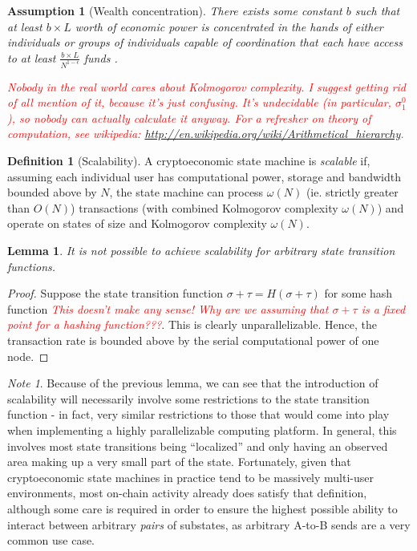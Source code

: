 \documentclass[11pt,a4paper]{report}
\newcommand{\comment}[1]{\textcolor{red}{\textit{#1}}}
\theoremstyle{plain}
\newtheorem{lem}[thm]{Lemma}
\newtheorem{assm}{Assumption}[chapter]
\theoremstyle{definition}
\newtheorem{defn}{Definition}[chapter]
\theoremstyle{remark}
\newtheorem*{note}{Note}
\begin{document}
\begin{assm}[Wealth concentration]
There exists some constant $b$ such that at least $b \times  L$ worth of economic power is concentrated in the hands of either individuals or groups of individuals capable of coordination that each have access to at least $\frac{b \times  L}{N^{1-\epsilon}}$ funds \citep{piketty_capital_2014}.
\end{assm}

\comment{Nobody in the real world cares about Kolmogorov complexity.  I suggest getting rid of all mention of it, because it's just confusing.  It's undecidable (in particular, $\sigma^0_1$), so nobody can actually calculate it anyway.  For a refresher on theory of computation, see wikipedia: \url{http://en.wikipedia.org/wiki/Arithmetical_hierarchy}.}

\begin{defn}[Scalability]
A cryptoeconomic state machine is \emph{scalable} if, assuming each individual user has computational power, storage and bandwidth bounded above by $N$, the state machine can process $\omega(N)$ (ie. strictly greater than $O(N)$) transactions (with combined Kolmogorov complexity $\omega(N)$) and operate on states of size and Kolmogorov complexity $\omega(N)$.
\end{defn}

\begin{lem}
It is not possible to achieve scalability for arbitrary state transition functions.
\end{lem}
\begin{proof}
Suppose the state transition function $\sigma + \tau = H(\sigma + \tau)$ for some hash function \comment{This doesn't make any sense!  Why are we assuming that $\sigma + \tau$ is a fixed point for a hashing function???}. This is clearly unparallelizable. Hence, the transaction rate is bounded above by the serial computational power of one node.
\end{proof}

\begin{note}
Because of the previous lemma, we can see that the introduction of scalability will necessarily involve some restrictions to the state transition function - in fact, very similar restrictions to those that would come into play when implementing a highly parallelizable computing platform. In general, this involves most state transitions being ``localized'' and only having an observed area making up a very small part of the state. Fortunately, given that cryptoeconomic state machines in practice tend to be massively multi-user environments, most on-chain activity already does satisfy that definition, although some care is required in order to ensure the highest possible ability to interact between arbitrary \emph{pairs} of substates, as arbitrary A-to-B sends are a very common use case.
\end{note}
\end{document}
